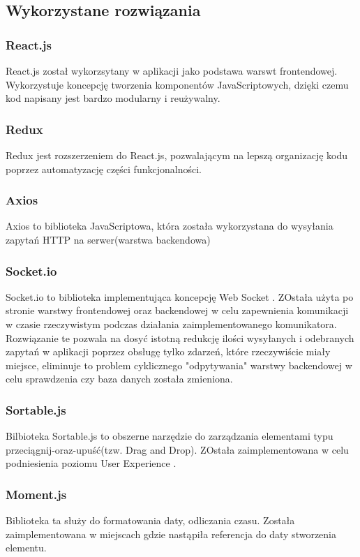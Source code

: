 \documentclass[eng,printmode]{mgr}
\begin{document}
\subsection{Wykorzystane rozwiązania}
\subsubsection{React.js}
React.js \cite {React} został wykorzsytany w aplikacji jako podstawa warswt frontendowej. Wykorzystuje koncepcję tworzenia komponentów JavaScriptowych, dzięki czemu kod napisany jest bardzo modularny i reużywalny.
\subsubsection{Redux}
Redux \cite {Redux} jest rozszerzeniem do React.js, pozwalającym na lepszą organizację kodu poprzez automatyzację części funkcjonalności.
\subsubsection{Axios}
Axios \cite {Axios} to biblioteka JavaScriptowa, która została wykorzystana do wysyłania zapytań HTTP na serwer(warstwa backendowa)
\subsubsection{Socket.io}
Socket.io \cite {Socket.io} to biblioteka implementująca koncepcję Web Socket \cite {web_socket}. ZOstała użyta po stronie warstwy frontendowej oraz backendowej w celu zapewnienia komunikacji w czasie rzeczywistym podczas działania zaimplementowanego komunikatora. Rozwiązanie te pozwala na dosyć istotną redukcję ilości wysyłanych i odebranych zapytań w aplikacji poprzez obsługę tylko zdarzeń, które rzeczywiście miały miejsce, eliminuje to problem cyklicznego "odpytywania" warstwy backendowej w celu sprawdzenia czy baza danych została zmieniona.
\subsubsection{Sortable.js}
Bilbioteka Sortable.js \cite{Sortable} to obszerne narzędzie do zarządzania elementami typu przeciągnij-oraz-upuść(tzw. Drag and Drop). ZOstała zaimplementowana w celu podniesienia poziomu User Experience \cite {UX}.
\subsubsection{Moment.js}
Biblioteka ta \cite {Moment} służy do formatowania daty, odliczania czasu. Została zaimplementowana w miejscach gdzie nastąpiła referencja do daty stworzenia elementu.
\end{document}
